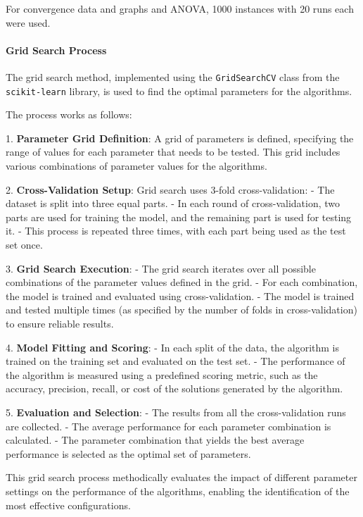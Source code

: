 \documentclass[
]{article}
\begin{document}
    For convergence data and graphs and ANOVA, 1000 instances with 20 runs each were used.

    \paragraph{Grid Search Process}
    The grid search method, implemented using the \texttt{GridSearchCV} class from the \texttt{scikit-learn} library, is used to find the optimal parameters for the algorithms.


    The process works as follows:

    1. \textbf{Parameter Grid Definition}: A grid of parameters is defined, specifying the range of values for each parameter that needs to be tested.
    This grid includes various combinations of parameter values for the algorithms.

    2. \textbf{Cross-Validation Setup}: Grid search uses 3-fold cross-validation:
    - The dataset is split into three equal parts.
    - In each round of cross-validation, two parts are used for training the model, and the remaining part is used for testing it.
    - This process is repeated three times, with each part being used as the test set once.

    3. \textbf{Grid Search Execution}:
    - The grid search iterates over all possible combinations of the parameter values defined in the grid.
    - For each combination, the model is trained and evaluated using cross-validation.
    - The model is trained and tested multiple times (as specified by the number of folds in cross-validation) to ensure reliable results.

    4. \textbf{Model Fitting and Scoring}:
    - In each split of the data, the algorithm is trained on the training set and evaluated on the test set.
    - The performance of the algorithm is measured using a predefined scoring metric, such as the accuracy, precision, recall, or cost of the solutions generated by the algorithm.

    5. \textbf{Evaluation and Selection}:
    - The results from all the cross-validation runs are collected.
    - The average performance for each parameter combination is calculated.
    - The parameter combination that yields the best average performance is selected as the optimal set of parameters.

    This grid search process methodically evaluates the impact of different parameter settings on the performance of the algorithms, enabling the identification of the most effective configurations.
\end{document}

